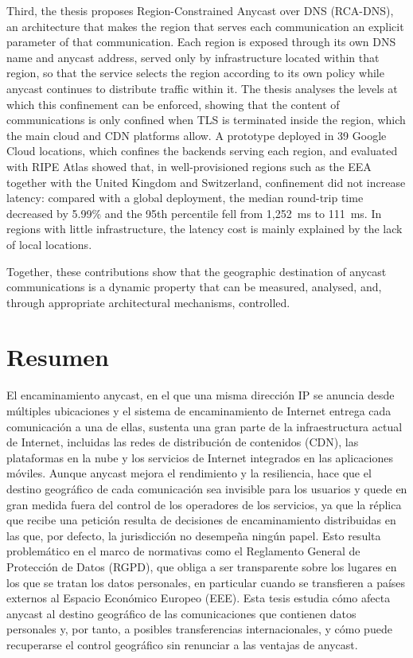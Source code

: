Third, the thesis proposes Region-Constrained Anycast over DNS (RCA-DNS), an architecture that makes the region that serves each communication an explicit parameter of that communication. Each region is exposed through its own DNS name and anycast address, served only by infrastructure located within that region, so that the service selects the region according to its own policy while anycast continues to distribute traffic within it. The thesis analyses the levels at which this confinement can be enforced, showing that the content of communications is only confined when TLS is terminated inside the region, which the main cloud and CDN platforms allow. A prototype deployed in 39 Google Cloud locations, which confines the backends serving each region, and evaluated with RIPE Atlas showed that, in well-provisioned regions such as the EEA together with the United Kingdom and Switzerland, confinement did not increase latency: compared with a global deployment, the median round-trip time decreased by 5.99\% and the 95th percentile fell from 1,252~ms to 111~ms. In regions with little infrastructure, the latency cost is mainly explained by the lack of local locations.

Together, these contributions show that the geographic destination of anycast communications is a dynamic property that can be measured, analysed, and, through appropriate architectural mechanisms, controlled.

\newpage
\section*{Resumen}
\label{sec::resumen}

El encaminamiento anycast, en el que una misma dirección IP se anuncia desde múltiples ubicaciones y el sistema de encaminamiento de Internet entrega cada comunicación a una de ellas, sustenta una gran parte de la infraestructura actual de Internet, incluidas las redes de distribución de contenidos (CDN), las plataformas en la nube y los servicios de Internet integrados en las aplicaciones móviles. Aunque anycast mejora el rendimiento y la resiliencia, hace que el destino geográfico de cada comunicación sea invisible para los usuarios y quede en gran medida fuera del control de los operadores de los servicios, ya que la réplica que recibe una petición resulta de decisiones de encaminamiento distribuidas en las que, por defecto, la jurisdicción no desempeña ningún papel. Esto resulta problemático en el marco de normativas como el Reglamento General de Protección de Datos (RGPD), que obliga a ser transparente sobre los lugares en los que se tratan los datos personales, en particular cuando se transfieren a países externos al Espacio Económico Europeo (EEE). Esta tesis estudia cómo afecta anycast al destino geográfico de las comunicaciones que contienen datos personales y, por tanto, a posibles transferencias internacionales, y cómo puede recuperarse el control geográfico sin renunciar a las ventajas de anycast.

